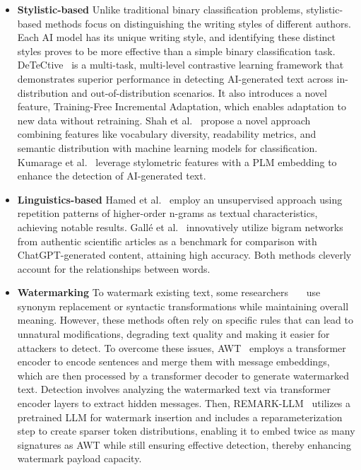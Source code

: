 \begin{itemize}
    \item \textbf{Stylistic-based} Unlike traditional binary classification problems, stylistic-based methods focus on distinguishing the writing styles of different authors. Each AI model has its unique writing style, and identifying these distinct styles proves to be more effective than a simple binary classification task.
    DeTeCtive~\cite{guo2024detective} is a multi-task, multi-level contrastive learning framework that demonstrates superior performance in detecting AI-generated text across in-distribution and out-of-distribution scenarios. It also introduces a novel feature, Training-Free Incremental Adaptation, which enables adaptation to new data without retraining.
    Shah et al.~\cite{shah2023detecting} propose a novel approach combining features like vocabulary diversity, readability metrics, and semantic distribution with machine learning models for classification. Kumarage et al.~\cite{kumarage2023stylometric} leverage stylometric features with a PLM embedding to enhance the detection of AI-generated text.
    
    \item \textbf{Linguistics-based}
    Hamed et al.~\cite{hamed2023improving} employ an unsupervised approach using repetition patterns of higher-order n-grams as textual characteristics, achieving notable results. Gallé et al.~\cite{galle2021unsupervised} innovatively utilize bigram networks from authentic scientific articles as a benchmark for comparison with ChatGPT-generated content, attaining high accuracy. Both methods cleverly account for the relationships between words.
    
    \item \textbf{Watermarking}
    To watermark existing text, some researchers~\cite{yoo2023robust}~\cite{munyer2024deeptextmark}~\cite{yang2023watermarking} use synonym replacement or syntactic transformations while maintaining overall meaning. However, these methods often rely on specific rules that can lead to unnatural modifications, degrading text quality and making it easier for attackers to detect. To overcome these issues, AWT~\cite{abdelnabi2021adversarial} employs a transformer encoder to encode sentences and merge them with message embeddings, which are then processed by a transformer decoder to generate watermarked text. Detection involves analyzing the watermarked text via transformer encoder layers to extract hidden messages. Then, REMARK-LLM~\cite{zhang2024remark} utilizes a pretrained LLM for watermark insertion and includes a reparameterization step to create sparser token distributions, enabling it to embed twice as many signatures as AWT while still ensuring effective detection, thereby enhancing watermark payload capacity.
    
\end{itemize}

